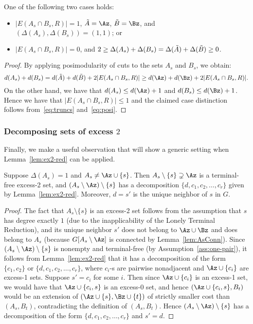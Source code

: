 \begin{lemma}\label{lem:posi}
One of the following two cases holds:
\begin{itemize}
\item $|E(A_s\cap B_s,R)|=1$, $\Atr=\Az$, $\Btr=\Bz$, and $(\Delta(A_s),\Delta(B_s))=(1,1)$; or
\item $|E(A_s\cap B_s,R)|=0$, and $2\geq \Delta(A_s)+\Delta(B_s)=\Delta(\tilde{A})+\Delta(\tilde{B})\geq 0$.
\end{itemize}
\end{lemma}
\begin{proof}
By applying posimodularity of cuts to the sets $A_s$ and $B_s$, we obtain:
\begin{equation}\label{eq:posi}
d(A_s)+d(B_s)=d(\Atr)+d(\Btr)+2|E(A_s\cap B_s,R)|\geq d(\Az)+d(\Bz)+2|E(A_s\cap B_s,R)|.
\end{equation}
On the other hand, we have that $d(A_s)\leq d(\Az)+1$ and $d(B_s)\leq d(\Bz)+1$. Hence we have that $|E(A_s\cap B_s,R)| \leq 1$ and the claimed case distinction follows from~\eqref{eq:truncs} and~\eqref{eq:posi}.
\end{proof}

\subsubsection{Decomposing sets of excess $2$}

Finally, we make a useful observation that will show a generic setting when Lemma~\ref{lem:ex2-red} can be applied.

\begin{lemma}\label{lem:cool}
Suppose $\Delta(A_s)=1$ and $A_s \neq \Az \cup \{s\}$. Then $A_s\setminus \{s\}\supsetneq \Az$ is a terminal-free excess-2 set, and $(A_s\setminus \Az)\setminus \{s\}$ has a decomposition $\{d,c_1,c_2,\ldots,c_r\}$ given by Lemma~\ref{lem:ex2-red}.
Moreover, $d=s'$ is the unique neighbor of $s$ in $G$.
\end{lemma}
\begin{proof}
The fact that $A_s\setminus \{s\}$ is an excess-2 set follows from the assumption that $s$ has degree exactly $1$ (due to the inapplicability of the Lonely Terminal Reduction), and its unique neighbor $s'$ does not belong to $\Az\cup \Bz$
and does belong to $A_s$ (because $G[A_s\setminus \Az]$ is connected by Lemma~\ref{lem:AsConn}).
Since $(A_s\setminus \Az)\setminus \{s\}$ is nonempty and terminal-free (by Assumption~\ref{ass:one-pair}),
it follows from Lemma~\ref{lem:ex2-red} that it has a decomposition of the form $\{c_1,c_2\}$ or $\{d,c_1,c_2,\ldots,c_r\}$, where $c_i$-s are pairwise nonadjacent and $\Az\cup \{c_i\}$ are excess-1 sets. Suppose $s'=c_i$ for some $i$. Then since $\Az\cup \{c_i\}$ is an excess-1 set, we would have that $\Az\cup \{c_i,s\}$ is an excess-0 set, and hence $(\Az\cup \{c_i,s\},B_t)$ would be an extension of $(\Az\cup \{s\},\Bz\cup \{t\})$ of strictly smaller cost than $(A_s,B_t)$, contradicting the definition of $(A_s,B_t)$. Hence $(A_s\setminus \Az)\setminus \{s\}$ has a decomposition of the form $\{d,c_1,c_2,\ldots,c_r\}$ and $s'=d$.
\end{proof}

